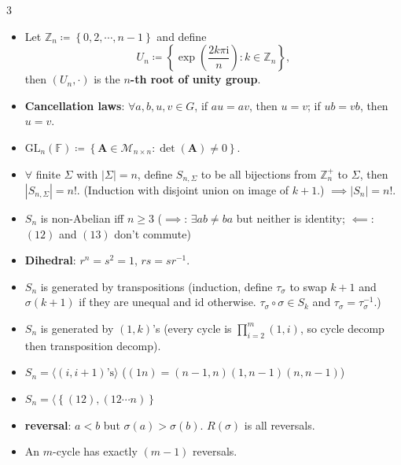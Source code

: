 \documentclass[10pt]{article}
\newcommand{\Z}{\mathbb{Z}} %
\newcommand{\abs}[1]{\left\lvert#1\right\rvert} %
\newcommand{\im}{\mathrm{i}}
\begin{document}
    \begin{multicols*}{3}
        \begin{itemize}
            \item Let $\Z_n \coloneqq \left\{0, 2, \cdots, n - 1\right\}$ and define 
            \begin{equation*}
                U_n \coloneqq \left\{\exp\left(\frac{2k\pi\im}{n}\right) \colon k \in \Z_n\right\},
            \end{equation*}
            then $\left(U_n, \cdot\right)$ is the \textbf{$n$-th root of unity group}.
            \item \textbf{Cancellation laws}: $\forall a, b, u, v \in G$, if $au = av$, then $u = v$; if $ub = vb$, then $u = v$.
            \item $\mathrm{GL}_n\left(\mathbb{F}\right) \coloneqq \left\{\bm{A} \in \mathcal{M}_{n \times n} \colon \det\left(\bm{A}\right) \neq 0\right\}$.
            \item $\forall$ finite $\Sigma$ with $\abs{\Sigma} = n$, define $S_{n, \Sigma}$ to be all bijections from $\Z_{n}^+$ to $\Sigma$, then $\abs{S_{n, \Sigma}} = n!$. (Induction with disjoint union on image of $k + 1$.) $\implies \abs{S_n} = n!$.
            \item $S_n$ is non-Abelian iff $n \geq 3$ ($\implies$: $\exists ab \neq ba$ but neither is identity; $\impliedby$: $\left(12\right)$ and $\left(13\right)$ don't commute)
            \item \textbf{Dihedral}: $r^n = s^2 = 1$, $rs = sr^{-1}$.
            \item $S_n$ is generated by transpositions (induction, define $\tau_{\sigma}$ to swap $k + 1$ and $\sigma\left(k + 1\right)$ if they are unequal and $\mathrm{id}$ otherwise. $\tau_{\sigma} \circ \sigma \in S_k$ and $\tau_{\sigma} = \tau_{\sigma}^{-1}$.)
            \item $S_n$ is generated by $\left(1, k\right)$'s (every cycle is $\prod_{i = 2}^m\left(1, i\right)$, so cycle decomp then transposition decomp).
            \item $S_n = \langle\left(i, i + 1\right)\textrm{'s}\rangle$ ($\left(1n\right) = \left(n - 1, n\right)\left(1, n - 1\right)\left(n, n - 1\right)$)
            \item $S_n = \langle\left\{\left(12\right), \left(12\cdots n\right)\right\}$
            \item \textbf{reversal}: $a < b$ but $\sigma\left(a\right) > \sigma\left(b\right)$. $R\left(\sigma\right)$ is all reversals.
            \item An $m$-cycle has exactly $\left(m - 1\right)$ reversals.

\end{itemize}
\end{multicols*}
\end{document}
